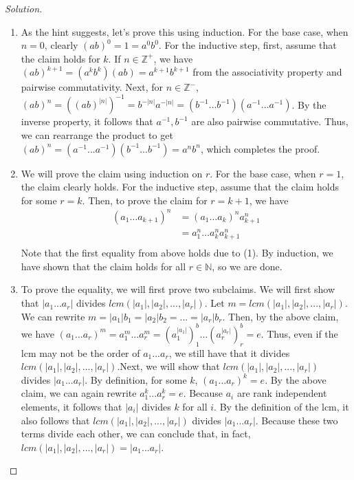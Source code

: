 \documentclass[11 pt]{article}
\theoremstyle{definition}
\theoremstyle{remark}
\newenvironment{solution}
  {\renewcommand\qedsymbol{$\blacksquare$}\begin{proof}[Solution]}
  {\end{proof}}
\begin{document}
\begin{solution}
\begin{enumerate}
\item As the hint suggests, let's prove this using induction. For the base case, when $n = 0$, clearly $(ab)^0 = 1 = a^0b^0$. For the inductive step, first, assume that the claim holds for $k$. If $n \in \mathbb{Z}^+$, we have $(ab)^{k+1}=(a^kb^k)(ab)=a^{k+1}b^{k+1}$ from the associativity property and pairwise commutativity. Next, for $n \in \mathbb{Z}^-$, $(ab)^n = ((ab)^{|n|})^{-1} = b^{-|n|}a^{-|n|} = (b^{-1}...b^{-1})(a^{-1}...a^{-1})$. By the inverse property, it follows that $a^{-1},b^{-1}$ are also pairwise commutative. Thus, we can rearrange the product to get $(ab)^n = (a^{-1}...a^{-1})(b^{-1}...b^{-1}) = a^nb^n$, which completes the proof.

\item We will prove the claim using induction on $r$. For the base case, when $r=1$, the claim clearly holds. For the inductive step, assume that the claim holds for some $r=k$. Then, to prove the claim for $r=k+1$, we have
\begin{align*}
    (a_1\dots a_{k+1})^n &= (a_1\dots a_{k})^n a_{k+1}^n \\
                         &= a_1^n\dots a_{k}^n a_{k+1}^n \\
\end{align*}
Note that the first equality from above holds due to (1). By induction, we have shown that the claim holds for all $r \in \mathbb{N}$, so we are done.


\item To prove the equality, we will first prove two subclaims. We will first show that $|a_1...a_r|$ divides $lcm(|a_1|,|a_2|,...,|a_r|)$. Let $m = lcm(|a_1|,|a_2|,...,|a_r|)$. We can rewrite $m = |a_1|b_1=|a_2|b_2 = ... = |a_r|b_r$. Then, by the above claim, we have $(a_1...a_r)^m = a_1^m...a_r^m=(a_1^{|a_1|})^b_1...(a_r^{|a_r|})^b_r=e$. Thus, even if the lcm may not be the order of $a_1...a_r$, we still have that it divides $lcm(|a_1|,|a_2|,...,|a_r|)$.Next, we will show that $lcm(|a_1|,|a_2|,...,|a_r|)$ divides $|a_1...a_r|$. By definition, for some $k$, $(a_1...a_r)^k=e$. By the above claim, we can again rewrite $a_1^k...a_r^k=e$. Because $a_i$ are rank independent elements, it follows that $|a_i|$ divides $k$ for all $i$. By the definition of the lcm, it also follows that $lcm(|a_1|,|a_2|,...,|a_r|)$ divides $|a_1...a_r|$. Because these two terms divide each other, we can conclude that, in fact, $lcm(|a_1|,|a_2|,...,|a_r|) = |a_1...a_r|$.


\end{enumerate}
\end{solution}
\end{document}

